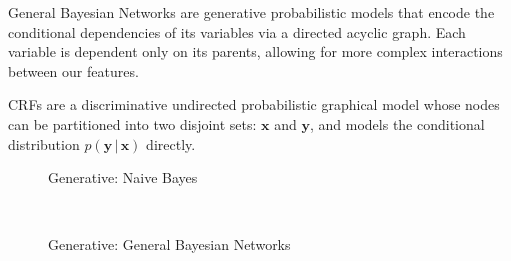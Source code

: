 \documentclass{article}
\begin{document}
General Bayesian Networks are generative probabilistic models that
encode the conditional dependencies of its variables via a directed acyclic
graph. Each variable is dependent only on its parents,
allowing for more complex interactions
between our features.

CRFs are a discriminative undirected probabilistic graphical model whose
nodes can be partitioned into two disjoint sets: $\mathbf{x}$ and $\mathbf{y}$,
and models the conditional distribution $p(\mathbf{y}\, | \, \mathbf{x})$
directly.

\begin{figure*}[h!]
    \centering
    \caption{Generative vs. Discriminative Models}
    \label{fig:models}
    \begin{subfigure}[t]{0.45\textwidth}
        \centering
        \caption*{Generative: Naive Bayes}
    \end{subfigure}%
    ~
    \begin{subfigure}[t]{0.45\textwidth}
        \centering
        \caption*{Generative: General Bayesian Networks}
    \end{subfigure}


\end{figure*}
\end{document}
